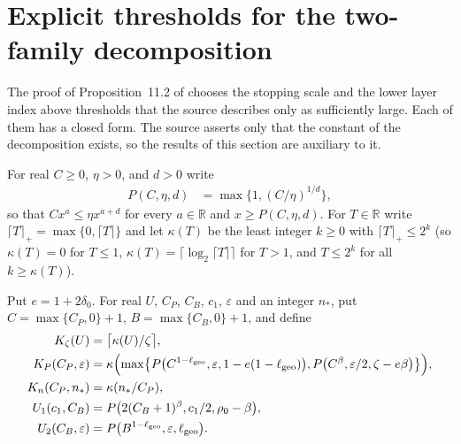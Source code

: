\section{Explicit thresholds for the two-family decomposition}
\label{sec:area_law_two_family_thresholds}

The proof of Proposition~11.2 of \cite{OpenAI2026AreaLaw} chooses the
stopping scale and the lower layer index above thresholds that the source
describes only as sufficiently large. Each of them has a closed form. The
source asserts only that the constant of the decomposition exists, so the
results of this section are auxiliary to it.

For real $C\ge0$, $\eta>0$, and $d>0$ write
\begin{align}
    P(C,\eta,d) & =\max\bigl\{1,(C/\eta)^{1/d}\bigr\},
    \label{eq:area_law_power_ratio_threshold}
\end{align}
so that $Cx^a\le\eta x^{a+d}$ for every $a\in\mathbb R$ and $x\ge P(C,\eta,d)$.
For $T\in\mathbb R$ write $\lceil T\rceil_+=\max\{0,\lceil T\rceil\}$ and let
$\kappa(T)$ be the least integer $k\ge0$ with $\lceil T\rceil_+\le2^k$
(so $\kappa(T)=0$ for $T\le1$, $\kappa(T)=\lceil\log_2\lceil T\rceil\rceil$ for
$T>1$, and $T\le2^k$ for all $k\ge\kappa(T)$).

\begin{definition}
    \label{def:area_law_two_family_scale_thresholds}
    \leanok
    Put $e=1+2\delta_0$. For real $U$, $C_P$, $C_B$, $c_1$, $\varepsilon$ and
    an integer $n_*$, put $C=\max\{C_P,0\}+1$, $B=\max\{C_B,0\}+1$, and
    define
    \begin{align}
        K_\zeta(U)           & =\bigl\lceil\kappa(U)/\zeta\bigr\rceil, \notag                 \\
        K_P(C_P,\varepsilon) & =\kappa\Bigl(\max\bigl\{
        P\bigl(C^{1-\ell_{\rm geo}},\varepsilon,1-e(1-\ell_{\rm geo})\bigr),
        P\bigl(C^\beta,\varepsilon/2,\zeta-e\beta\bigr)\bigr\}\Bigr), \notag                  \\
        K_n(C_P,n_*)         & =\kappa(n_*/C_P), \notag                                       \\
        U_1(c_1,C_B)         & =P\bigl(2(C_B+1)^\beta,c_1/2,\rho_0-\beta\bigr), \notag        \\
        U_2(C_B,\varepsilon) & =P\bigl(B^{1-\ell_{\rm geo}},\varepsilon,\ell_{\rm geo}\bigr).
        \label{eq:area_law_scale_thresholds}
    \end{align}
\end{definition}

